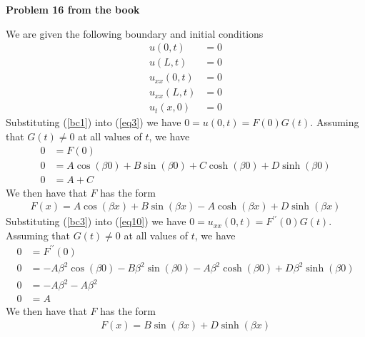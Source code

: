 \documentclass[12pt]{article}
\newcommand{\problem}[1]{\hspace{-4 ex} \large \textbf{Problem #1} }
\begin{document}
\problem{16 from the book}

	We are given the following boundary and initial conditions
	\begin{align}
		u(0,t) & = 0 \label{bc1} \\
		u(L,t) & = 0 \label{bc2} \\
		u_{xx}(0,t) & = 0 \label{bc3} \\
		u_{xx}(L,t) & = 0 \label{bc4} \\
		u_t(x,0) & = 0 \label{ic1}
	\end{align}
	Substituting (\ref{bc1}) into (\ref{eq3}) we have $0 = u(0,t) = F(0)G(t)$. Assuming that $G(t) \neq 0$ at all values of $t$, we have
	\begin{align*}
		0 & = F(0) \\
		0 & = A \cos(\beta 0) + B \sin(\beta 0) + C \cosh(\beta 0) + D \sinh(\beta 0) \\
		0 & = A + C
	\end{align*}
	We then have that $F$ has the form
	\begin{align}
		F(x) = A \cos(\beta x) + B \sin(\beta x) - A \cosh(\beta x) + D \sinh(\beta x) \label{eq10}
	\end{align}
	Substituting (\ref{bc3}) into (\ref{eq10}) we have $0 = u_{xx}(0,t) = F^{\prime\prime}(0)G(t)$. Assuming that $G(t) \neq 0$ at all values of $t$, we have
	\begin{align*}
		0 & = F^{\prime\prime}(0) \\
		0 & = -A \beta^2\cos(\beta 0) - B \beta^2 \sin(\beta 0) -A \beta^2 \cosh(\beta 0) + D \beta^2 \sinh(\beta 0) \\
		0 & = -A \beta^2 -A \beta^2 \\
		0 & = A
	\end{align*}
	We then have that $F$ has the form
	\begin{align}
		F(x) = B \sin(\beta x) + D \sinh(\beta x) \label{eq11}
	\end{align} 
	
\end{document}

